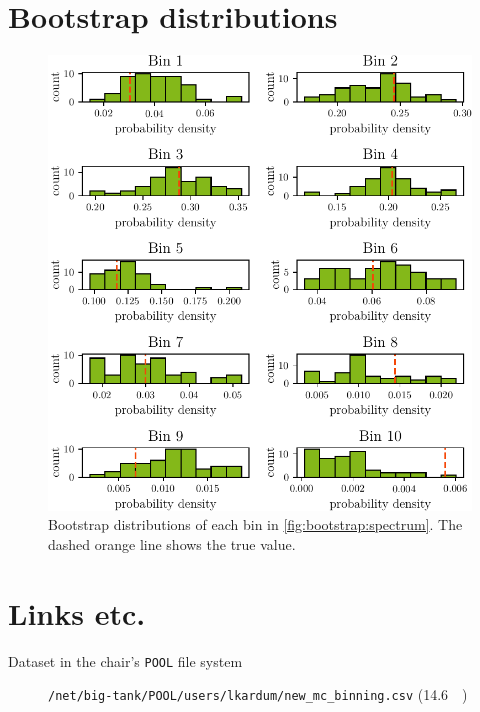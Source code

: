 \section{Bootstrap distributions}
\begin{figure}
  \centering
  \includegraphics[scale=1]{content/plots/bootstrap:distributions_doubleheight.pdf}
  \caption{
    Bootstrap distributions of each bin in \autoref{fig:bootstrap:spectrum}.
    The dashed orange line shows the true value.
  }
  \label{fig:bootstrap:distributions}
\end{figure}


\clearpage
\section{Links etc.}
\begin{description}
  \item[Dataset in the chair's \texttt{POOL} file system] \texttt{/net/big-tank/POOL/users/lkardum/new\_mc\_binning.csv} (\SI{14.6}{\giga\byte})
\end{description}
